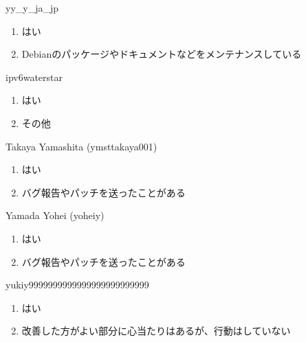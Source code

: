 \begin{prework}{ yy\_y\_ja\_jp }
  \begin{enumerate}
  \item はい
  \item Debianのパッケージやドキュメントなどをメンテナンスしている
  \end{enumerate}
\end{prework}

\begin{prework}{ ipv6waterstar }
  \begin{enumerate}
  \item はい
  \item その他
  \end{enumerate}
\end{prework}

\begin{prework}{ Takaya Yamashita (ymsttakaya001) }
  \begin{enumerate}
  \item はい
  \item バグ報告やパッチを送ったことがある
  \end{enumerate}
\end{prework}

\begin{prework}{ Yamada Yohei (yoheiy) }
  \begin{enumerate}
  \item はい
  \item バグ報告やパッチを送ったことがある
  \end{enumerate}
\end{prework}

\begin{prework}{ yukiy9999999999999999999999999 }
  \begin{enumerate}
  \item はい
  \item 改善した方がよい部分に心当たりはあるが、行動はしていない
  \end{enumerate}
\end{prework}

